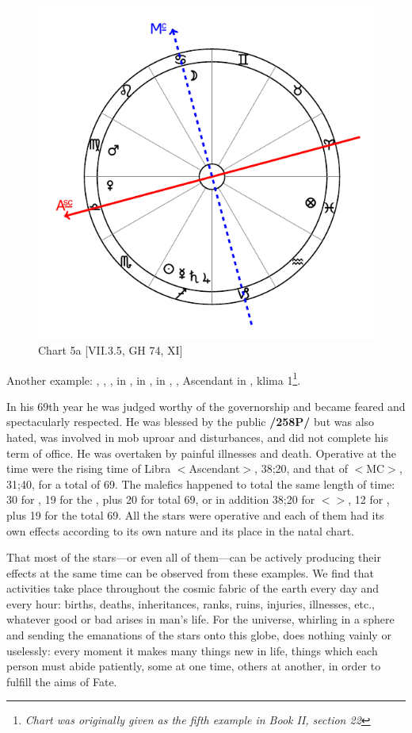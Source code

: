 \begin{figure}
\centering
\vspace{-20pt}
\includegraphics[width=.68\textwidth]{charts/2_21_5}
\caption{Chart 5a [VII.3.5, GH 74, XI]}
\label{fig:chart5a}
\end{figure} 

Another example: \Sun, \Saturn, \Jupiter, \Mercury\xspace in \Sagittarius, \Moon\xspace in \Cancer, \Mars\xspace in \Virgo,
\Venus, Ascendant in \Libra, klima 1\footnote{\textit{Chart was originally given as the fifth example in Book II, section 22}}.

In his 69th year he was judged worthy of the governorship and became feared and spectacularly respected. He was blessed by the public \textbf{/258P/} but was also hated, was involved in mob uproar and disturbances, and did not complete his term of office. He was overtaken by painful illnesses and death. Operative at the time were the rising time of Libra $<$Ascendant$>$, 38;20, and
that of \Cancer\xspace $<$MC$>$, 31;40, for a total of 69. The malefics happened to total the same length of time: 30 for \Saturn, 19 for the \Sun, plus 20 for \Mercury\xspace total 69, or in addition 38;20 for \Virgo $<$\Mars$>$, 12 for \Jupiter, plus 19 for the \Sun\xspace total 69. All the stars were operative and each of them had its own effects according to its own nature and its place in the natal chart.

That most of the stars—or even all of them—can be actively producing their effects at the same time can be observed from these examples. We find that activities take place throughout the cosmic fabric of the
earth every day and every hour: births, deaths, inheritances, ranks, ruins, injuries, illnesses, etc., whatever good or bad arises in man’s life. For the universe, whirling in a sphere and sending the emanations of the stars onto this globe, does nothing vainly or uselessly: every moment it makes many things new in life, things which each person must abide patiently, some at one time, others at another, in order to fulfill the aims of Fate.

